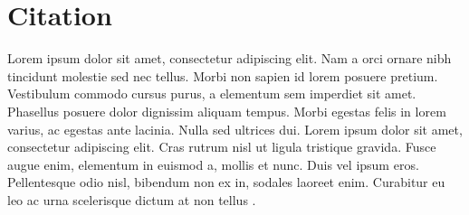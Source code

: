 \chapter{Citation}

Lorem ipsum dolor sit amet, consectetur adipiscing elit. Nam a orci ornare nibh tincidunt molestie sed nec tellus. Morbi non sapien id lorem posuere pretium. Vestibulum commodo cursus purus, a elementum sem imperdiet sit amet. Phasellus posuere dolor dignissim aliquam tempus. Morbi egestas felis in lorem varius, ac egestas ante lacinia. Nulla sed ultrices dui. Lorem ipsum dolor sit amet, consectetur adipiscing elit. Cras rutrum nisl ut ligula tristique gravida. Fusce augue enim, elementum in euismod a, mollis et nunc. Duis vel ipsum eros. Pellentesque odio nisl, bibendum non ex in, sodales laoreet enim. Curabitur eu leo ac urna scelerisque dictum at non tellus .
